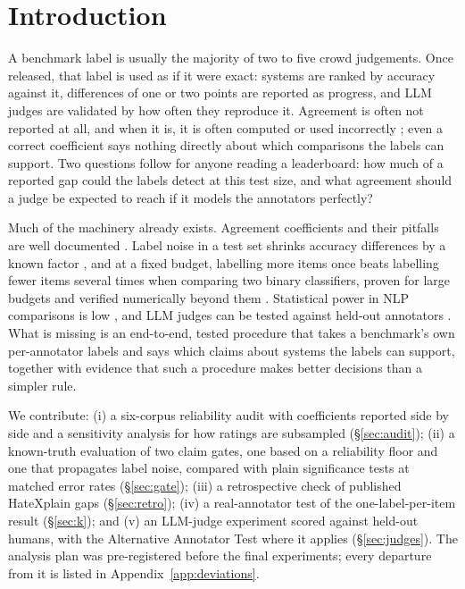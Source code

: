 \documentclass[11pt]{article}
\begin{document}
\section{Introduction}
A benchmark label is usually the majority of two to five crowd judgements. Once released, that label is used as if it were exact: systems are ranked by accuracy against it, differences of one or two points are reported as progress, and LLM judges are validated by how often they reproduce it. Agreement is often not reported at all, and when it is, it is often computed or used incorrectly \citep{klie2024analyzing,kunilovskaya2026who}; even a correct coefficient says nothing directly about which comparisons the labels can support. Two questions follow for anyone reading a leaderboard: how much of a reported gap could the labels detect at this test size, and what agreement should a judge be expected to reach if it models the annotators perfectly?

Much of the machinery already exists. Agreement coefficients and their pitfalls are well documented \citep{artstein2008survey,krippendorff2004reliability,feinstein1990high,gwet2008computing}. Label noise in a test set shrinks accuracy differences by a known factor \citep{lam2003evaluating}, and at a fixed budget, labelling more items once beats labelling fewer items several times when comparing two binary classifiers, proven for large budgets and verified numerically beyond them \citep{dorner2024dont}. Statistical power in NLP comparisons is low \citep{card2020little}, and LLM judges can be tested against held-out annotators \citep{calderon2025alternative}. What is missing is an end-to-end, tested procedure that takes a benchmark's own per-annotator labels and says which claims about systems the labels can support, together with evidence that such a procedure makes better decisions than a simpler rule.

We contribute: (i) a six-corpus reliability audit with coefficients reported side by side and a sensitivity analysis for how ratings are subsampled (\S\ref{sec:audit}); (ii) a known-truth evaluation of two claim gates, one based on a reliability floor and one that propagates label noise, compared with plain significance tests at matched error rates (\S\ref{sec:gate}); (iii) a retrospective check of published HateXplain gaps (\S\ref{sec:retro}); (iv) a real-annotator test of the one-label-per-item result (\S\ref{sec:k}); and (v) an LLM-judge experiment scored against held-out humans, with the Alternative Annotator Test \citep{calderon2025alternative} where it applies (\S\ref{sec:judges}). The analysis plan was pre-registered before the final experiments; every departure from it is listed in Appendix~\ref{app:deviations}.
\end{document}
